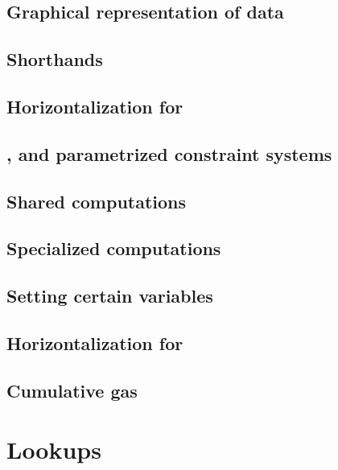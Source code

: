 \subsection{Graphical representation of data}                               \label{txn_data: constraints: graphical representation}       
\subsection{Shorthands}                                                     \label{txn_data: constraints: shorthands}                     
\subsection{Horizontalization for \rlpTxnMod{}}                             \label{txn_data: constraints: horizontalization rlpTxn}       
\subsection{\wcpFlag{}, \eucFlag{} and parametrized constraint systems}     \label{txn_data: constraints: comparison constraints}         
\subsection{Shared computations}                                            \label{txn_data: constraints: common computations}            
\subsection{Specialized computations}                                       \label{txn_data: constraints: specialized computations}       
\subsection{Setting certain variables}                                      \label{txn_data: constraints: setting variables}              
\subsection{Horizontalization for \rlpTxnRcptMod{}}                         \label{txn_data: constraints: horizontalization rlpTxnRcpt}   
\subsection{Cumulative gas}                                                 \label{txn_data: constraints: cumulative gas}                 

\section{Lookups}                                                           \label{txn_data: lookups}                                 
